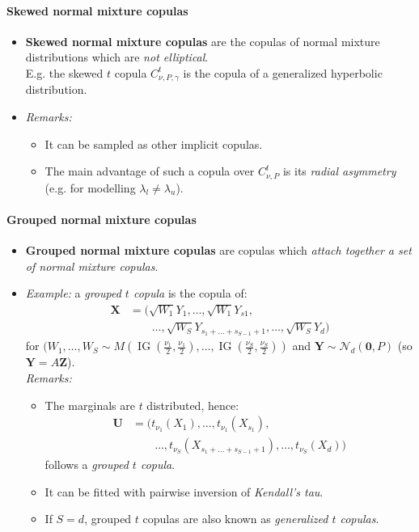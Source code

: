 \documentclass[a4paper,landscape,8pt,fleqn]{scrartcl}
\renewcommand{\emph}[1]{\textbf{#1}}
\DeclareMathOperator{\IG}{IG}					%
\begin{document}
\begin{multicols*}{3}
\paragraph{Skewed normal mixture copulas}
\begin{itemize}
\item \emph{Skewed normal mixture copulas} are the copulas of normal mixture distributions which are \textit{not elliptical}. \\
E.g. the skewed $t$ copula $C_{\nu, P, \gamma}^t$ is the copula of a generalized hyperbolic distribution.
\item \textit{Remarks:}
\begin{itemize}
\item It can be sampled as other implicit copulas.
\item The main advantage of such a copula over $C_{\nu, P}^t$ is its \textit{radial asymmetry} (e.g. for modelling $\lambda_l \neq \lambda_u$).
\end{itemize}
\end{itemize}

\paragraph{Grouped normal mixture copulas}
\begin{itemize}
\item \emph{Grouped normal mixture copulas} are copulas which \textit{attach together a set of normal mixture copulas}.
\item \textit{Example:} a \textit{grouped $t$ copula} is the copula of:
\begin{align*}
\bm X &= (\sqrt{W_1} Y_1, \ldots, \sqrt{W_1} Y_{s1}, \\
&\qquad \ldots, \sqrt{W_S} Y_{s_1+\ldots+s_{S-1}+1}, \ldots, \sqrt{W_S} Y_d)
\end{align*}
for $(W_1, \ldots, W_S \sim M(\IG(\frac{\nu_1}{2}, \frac{\nu_1}{2}), \ldots, \IG(\frac{\nu_S}{2}, \frac{\nu_S}{2}))$ and $\bm Y \sim \mathcal{N}_d(\bm 0, P)$ (so $\bm Y = A \bm Z$). \\
\textit{Remarks:}
\begin{itemize}
\item The marginals are $t$ distributed, hence:
\begin{align*}
\bm U &= (t_{\nu_1}(X_1), \ldots, t_{\nu_1}(X_{s_1}), \\
&\qquad \ldots, t_{\nu_S}(X_{s_1+\ldots+s_{S-1}+1}), \ldots, t_{\nu_S}(X_d))
\end{align*}
follows a \textit{grouped $t$ copula}.
\item It can be fitted with pairwise inversion of \textit{Kendall's tau}.
\item If $S=d$, grouped $t$ copulas are also known as \textit{generalized $t$ copulas}.
\end{itemize}
\end{itemize}


\end{multicols*}
\end{document}
